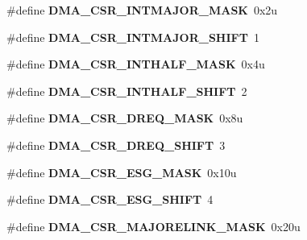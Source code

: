 \begin{DoxyCompactItemize}
\item 
\#define {\bfseries D\+M\+A\+\_\+\+C\+S\+R\+\_\+\+I\+N\+T\+M\+A\+J\+O\+R\+\_\+\+M\+A\+SK}~0x2u\hypertarget{group__DMA__Register__Masks_ga8d41b8ec510ae91e64c21d13721a272d}{}\label{group__DMA__Register__Masks_ga8d41b8ec510ae91e64c21d13721a272d}

\item 
\#define {\bfseries D\+M\+A\+\_\+\+C\+S\+R\+\_\+\+I\+N\+T\+M\+A\+J\+O\+R\+\_\+\+S\+H\+I\+FT}~1\hypertarget{group__DMA__Register__Masks_ga3e62ac93fd0c7b4f8a78612dc83d67a4}{}\label{group__DMA__Register__Masks_ga3e62ac93fd0c7b4f8a78612dc83d67a4}

\item 
\#define {\bfseries D\+M\+A\+\_\+\+C\+S\+R\+\_\+\+I\+N\+T\+H\+A\+L\+F\+\_\+\+M\+A\+SK}~0x4u\hypertarget{group__DMA__Register__Masks_ga65d795eca7173289b56fc862abbf6703}{}\label{group__DMA__Register__Masks_ga65d795eca7173289b56fc862abbf6703}

\item 
\#define {\bfseries D\+M\+A\+\_\+\+C\+S\+R\+\_\+\+I\+N\+T\+H\+A\+L\+F\+\_\+\+S\+H\+I\+FT}~2\hypertarget{group__DMA__Register__Masks_ga72ab8889d41c8ab88cea74dcb81d0f00}{}\label{group__DMA__Register__Masks_ga72ab8889d41c8ab88cea74dcb81d0f00}

\item 
\#define {\bfseries D\+M\+A\+\_\+\+C\+S\+R\+\_\+\+D\+R\+E\+Q\+\_\+\+M\+A\+SK}~0x8u\hypertarget{group__DMA__Register__Masks_ga5c490f9434d06e1bf11f5d5701dd546e}{}\label{group__DMA__Register__Masks_ga5c490f9434d06e1bf11f5d5701dd546e}

\item 
\#define {\bfseries D\+M\+A\+\_\+\+C\+S\+R\+\_\+\+D\+R\+E\+Q\+\_\+\+S\+H\+I\+FT}~3\hypertarget{group__DMA__Register__Masks_ga5932e5b14fcfbde57315d875dc3288fd}{}\label{group__DMA__Register__Masks_ga5932e5b14fcfbde57315d875dc3288fd}

\item 
\#define {\bfseries D\+M\+A\+\_\+\+C\+S\+R\+\_\+\+E\+S\+G\+\_\+\+M\+A\+SK}~0x10u\hypertarget{group__DMA__Register__Masks_ga58c5b388126424c012533eec1020e15d}{}\label{group__DMA__Register__Masks_ga58c5b388126424c012533eec1020e15d}

\item 
\#define {\bfseries D\+M\+A\+\_\+\+C\+S\+R\+\_\+\+E\+S\+G\+\_\+\+S\+H\+I\+FT}~4\hypertarget{group__DMA__Register__Masks_gaac36360d5090fc436e557ad8859046c4}{}\label{group__DMA__Register__Masks_gaac36360d5090fc436e557ad8859046c4}

\item 
\#define {\bfseries D\+M\+A\+\_\+\+C\+S\+R\+\_\+\+M\+A\+J\+O\+R\+E\+L\+I\+N\+K\+\_\+\+M\+A\+SK}~0x20u\hypertarget{group__DMA__Register__Masks_gaeb6466fd98e1ae2a8f7a682124192b97}{}\label{group__DMA__Register__Masks_gaeb6466fd98e1ae2a8f7a682124192b97}


\end{DoxyCompactItemize}
